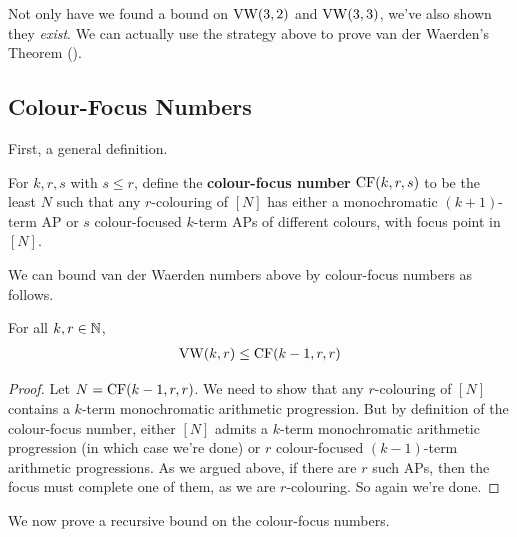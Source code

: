 Not only have we found a bound on $\operatorname{VW}(3, 2)$ and $\operatorname{VW}(3, 3)$, we've also shown they \textit{exist}. We can actually use the strategy above to prove van der Waerden's Theorem ().

\subsection{Colour-Focus Numbers}

First, a general definition.

\begin{boxdefinition}
    For $k, r, s$ with $s \le r$, define the \textbf{colour-focus number} $\operatorname{CF}(k, r, s)$ to be the least $N$ such that any $r$-colouring of $[N]$ has either a monochromatic $(k + 1)$-term AP or $s$ colour-focused $k$-term APs of different colours, with focus point in $[N]$.
\end{boxdefinition}

We can bound van der Waerden numbers above by colour-focus numbers as follows.

\begin{boxlemma}\label{Ch6:Lemma:VW_le_CF}
    For all $k, r \in \mathbb{N}$,
    \begin{align*}
        \operatorname{VW}(k, r) \le \operatorname{CF}(k-1, r, r)
    \end{align*}
\end{boxlemma}
\begin{proof}
    Let $N = \operatorname{CF}(k-1, r, r)$. We need to show that any $r$-colouring of $[N]$ contains a $k$-term monochromatic arithmetic progression. But by definition of the colour-focus number, either $[N]$ admits a $k$-term monochromatic arithmetic progression (in which case we're done) or $r$ colour-focused $(k - 1)$-term arithmetic progressions. As we argued above, if there are $r$ such APs, then the focus must complete one of them, as we are $r$-colouring. So again we're done.
\end{proof}

We now prove a recursive bound on the colour-focus numbers.

